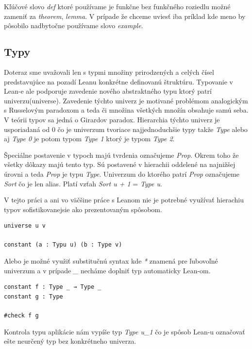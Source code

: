 \documentclass[a4paper,10pt,oneside]{report}%
\begin{document}
    Kľúčové slovo \emph{def} ktoré používame je funkčne bez funkčného roziedlu možné
zameniť za \emph{theorem}, \emph{lemma}. V prípade že chceme uviesť iba príklad
kde meno by pôsobilo nadbytočne používame slovo \emph{example}.

\subsection{Typy}
    Doteraz sme uvažovali len s typmi množiny prirodzených a celých čísel
predstavujúce na pozadí Leanu konkrétne definovanú štruktúru.
    Typovanie v Lean-e ale podporuje zavedenie nového abstraktného typu ktorý patrí univerzu(universe).
    Zavedenie týchto univerz je motivané problémom analogickým s Russelovým paradoxom 
a teda či množina všetkých množín obsahuje samú seba.
    V teórii typov sa jedná o Girardov paradox.
    Hierarchia týchto univerz je usporiadaná od 0 čo je univerzum tvoriace najjednoduchšie
typy takže \emph{Type} alebo aj \emph{Type 0} je potom typom \emph{Type 1} ktorý
je typom \emph{Type 2}.

    Špeciálne postavenie v typoch majú tvrdenia označujeme \emph{Prop}.
    Okrem toho že všetky dôkazy majú tento typ. 
    Sú postavené v hierachii oddelené na najnižšej úrovni a teda \emph{Prop} je 
typu \emph{Type}.
    Univerzum do ktorého patrí \emph{Prop} označujeme \emph{Sort} čo je len 
alias.
Platí vzťah \emph{Sort u + 1} = \emph{Type u}.

V tejto práci a ani vo väčšine práce s Leanom nie je potrebné využívať hierachiu
    typov sofistikovanejsie ako prezentovaným spôsobom.
\begin{lstlisting}
universe u v

constant (a : Typu u) (b : Type v)
\end{lstlisting}
Alebo je možné využiť substitučnú syntax kde \emph{*} znamená pre ľubovoľné univerzum
a v prípade \emph{\_} necháme doplniť typ automaticky Lean-om.
\begin{lstlisting}
constant f : Type _ → Type _
constant g : Type

#check f g
\end{lstlisting}
    Kontrola typu aplikácie nám vypíše typ \emph{Type u\_1} čo je spôsob Lean-u označovať
ešte neurčený typ bez konkrétneho univerza.
\end{document}
